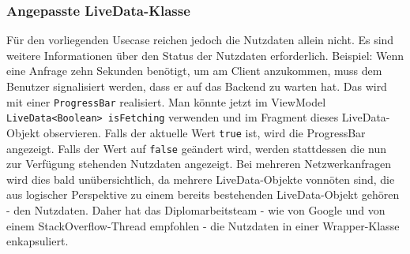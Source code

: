 \hypertarget{angepasste-livedata-klasse}{%
\subsubsection{Angepasste
LiveData-Klasse}\label{angepasste-livedata-klasse}}

Für den vorliegenden Usecase reichen jedoch die Nutzdaten allein nicht.
Es sind weitere Informationen über den Status der Nutzdaten
erforderlich. Beispiel: Wenn eine Anfrage zehn Sekunden benötigt, um am
Client anzukommen, muss dem Benutzer signalisiert werden, dass er auf
das Backend zu warten hat. Das wird mit einer \texttt{ProgressBar}
realisiert. Man könnte jetzt im ViewModel
\texttt{LiveData\textless{}Boolean\textgreater{}\ isFetching} verwenden
und im Fragment dieses LiveData-Objekt observieren. Falls der aktuelle
Wert \texttt{true} ist, wird die ProgressBar angezeigt. Falls der Wert
auf \texttt{false} geändert wird, werden stattdessen die nun zur
Verfügung stehenden Nutzdaten angezeigt. Bei mehreren Netzwerkanfragen
wird dies bald unübersichtlich, da mehrere LiveData-Objekte vonnöten
sind, die aus logischer Perspektive zu einem bereits bestehenden
LiveData-Objekt gehören - den Nutzdaten. Daher hat das Diplomarbeitsteam
- wie von Google \cite{google-wrapper} und von einem
StackOverflow-Thread \cite{so-wrapper} empfohlen - die Nutzdaten in
einer Wrapper-Klasse enkapsuliert.

\begin{Shaded}
\begin{Highlighting}[]
 

     


     


      \NormalTok{() \{}
\NormalTok{    \}}

    \NormalTok{() \{}
\NormalTok{    \}}

      \NormalTok{() \{}
\NormalTok{    \}}

      \NormalTok{ \{}
\NormalTok{    \}}
\NormalTok{\}}
\end{Highlighting}
\end{Shaded}

